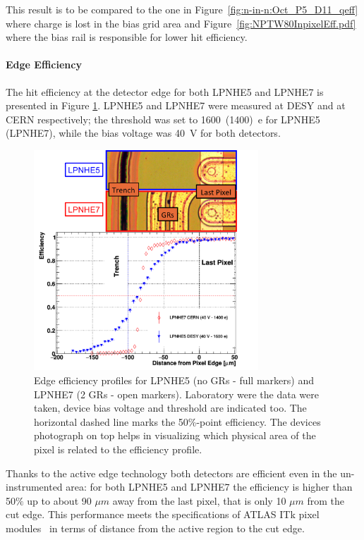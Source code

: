 This result is to be compared to the one in Figure~\ref{fig:n-in-n:Oct_P5_D11_qeff} where charge is lost 
in the bias grid area and Figure~\ref{fig:NPTW80InpixelEff.pdf} where the bias rail is responsible for 
lower hit efficiency.

\paragraph{Edge Efficiency}
The hit efficiency at the detector edge for both LPNHE5 and LPNHE7 is presented in Figure \ref{fig:edge_comparison}. LPNHE5 and LPNHE7 were measured at DESY and at CERN respectively; the threshold was set to 1600~(1400)~e for LPNHE5 (LPNHE7), while the bias voltage was 40~V for both detectors.
\begin{figure}[!htbp]
\centering 
\includegraphics[width=0.75\textwidth,origin=c,angle=0]{edgeeff_full_range_pics.png}
\caption{\label{fig:edge_comparison}
Edge efficiency profiles for  LPNHE5 (no GRs - full markers) and LPNHE7 (2 GRs - open markers). Laboratory were the data were taken, device bias voltage and threshold are indicated too. The horizontal dashed line marks the
50\%-point efficiency. The devices photograph on top helps in visualizing which physical area of the pixel is related to the efficiency profile.}
\end{figure}

Thanks to the active edge technology both detectors are efficient even in the un-instrumented area: for both LPNHE5 and LPNHE7 the efficiency is higher than 50$\%$ up to about 90 $\mu m$ away from the last pixel, that is only 10 $\mu m$ from the cut edge. This performance meets the specifications of ATLAS ITk pixel modules~\cite{ITkStripsTDR} in terms of distance from the active region to the cut edge.

